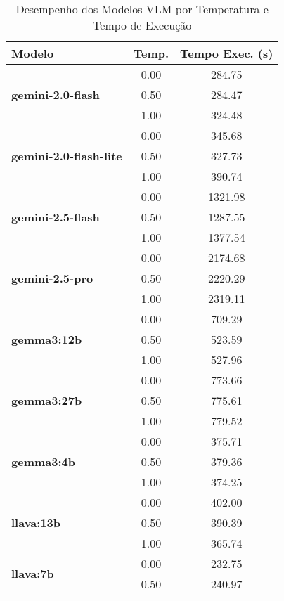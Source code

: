 \begin{table}[htbp]
  \centering
  \caption{Desempenho dos Modelos VLM por Temperatura e Tempo de Execução}
  \label{tab:vlm_performance_report_com_temp_sem_metricas}
  \
  \begin{tabular}{lcc}
    \textbf{Modelo} & \textbf{Temp.} & \textbf{Tempo Exec. (s)} \\
    \midrule
    \multirow{3}{*}{\textbf{gemini-2.0-flash}} & 0.00 & 284.75 \\
     & 0.50 & 284.47 \\
     & 1.00 & 324.48 \\
    \midrule
    \multirow{3}{*}{\textbf{gemini-2.0-flash-lite}} & 0.00 & 345.68 \\
     & 0.50 & 327.73 \\
     & 1.00 & 390.74 \\
    \midrule
    \multirow{3}{*}{\textbf{gemini-2.5-flash}} & 0.00 & 1321.98 \\
     & 0.50 & 1287.55 \\
     & 1.00 & 1377.54 \\
    \midrule
    \multirow{3}{*}{\textbf{gemini-2.5-pro}} & 0.00 & 2174.68 \\
     & 0.50 & 2220.29 \\
     & 1.00 & 2319.11 \\
    \midrule
    \multirow{3}{*}{\textbf{gemma3:12b}} & 0.00 & 709.29 \\
     & 0.50 & 523.59 \\
     & 1.00 & 527.96 \\
    \midrule
    \multirow{3}{*}{\textbf{gemma3:27b}} & 0.00 & 773.66 \\
     & 0.50 & 775.61 \\
     & 1.00 & 779.52 \\
    \midrule
    \multirow{3}{*}{\textbf{gemma3:4b}} & 0.00 & 375.71 \\
     & 0.50 & 379.36 \\
     & 1.00 & 374.25 \\
    \midrule
    \multirow{3}{*}{\textbf{llava:13b}} & 0.00 & 402.00 \\
     & 0.50 & 390.39 \\
     & 1.00 & 365.74 \\
    \midrule
    \multirow{3}{*}{\textbf{llava:7b}} & 0.00 & 232.75 \\
     & 0.50 & 240.97 \\

\end{tabular}
\end{table}
